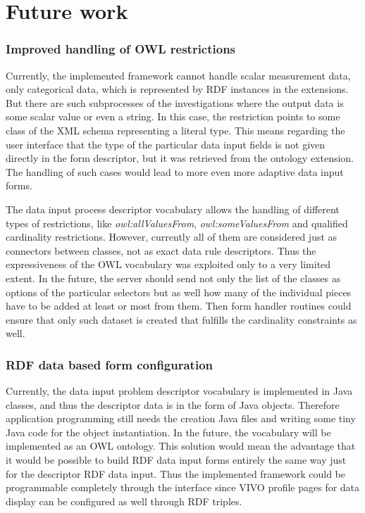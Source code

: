 \section{Future work}

\subsubsection{Improved handling of OWL restrictions}

Currently, the implemented framework cannot handle scalar measurement data, only categorical data, which is represented by RDF instances in the extensions. But there are such subprocesses of the investigations where the output data is some scalar value or even a string. In this case, the restriction points to some class of the XML schema representing a literal type. This means regarding the user interface that the type of the particular data input fields is not given directly in the form descriptor, but it was retrieved from the ontology extension. The handling of such cases would lead to more even more adaptive data input forms.

The data input process descriptor vocabulary allows the handling of different types of restrictions, like \textit{owl:allValuesFrom}, \textit{owl:someValuesFrom} and qualified cardinality restrictions. However, currently all of them are considered just as connectors between classes, not as exact data rule descriptors. Thus the expressiveness of the OWL vocabulary was exploited only to a very limited extent. In the future, the server should send not only the list of the classes as options of the particular selectors but as well how many of the individual pieces have to be added at least or most from them. Then form handler routines could ensure that only such dataset is created that fulfills the cardinality constraints as well.

\subsubsection{RDF data based form configuration}

Currently, the data input problem descriptor vocabulary is implemented in Java classes, and thus the descriptor data is in the form of Java objects. Therefore application programming still needs the creation Java files and writing some tiny Java code for the object instantiation. In the future, the vocabulary will be implemented as an OWL ontology. This solution would mean the advantage that it would be possible to build RDF data input forms entirely the same way just for the descriptor RDF data input. Thus the implemented framework could be programmable completely through the interface since VIVO profile pages for data display can be configured as well through RDF triples.


